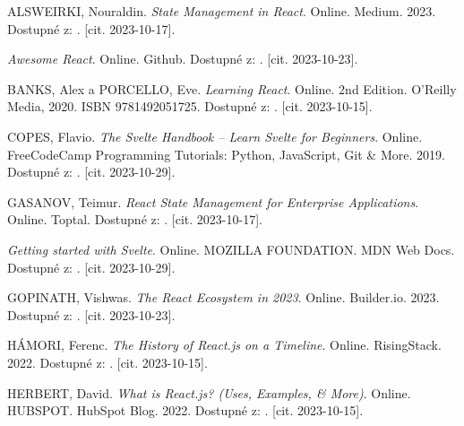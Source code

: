 

\begin{thebibliography}{99}\radkovani[1.2]\raggedright
\label{chap:literatura}

\textsc{ALSWEIRKI}, Nouraldin. \emph{State Management in React}. Online. Medium. 2023. Dostupné z: . [cit. 2023-10-17].

\emph{Awesome React}. Online. Github. Dostupné z: . [cit. 2023-10-23].

\textsc{BANKS}, Alex a \textsc{PORCELLO}, Eve. \emph{Learning React}. Online. 2nd Edition. O'Reilly Media, 2020. ISBN 9781492051725. Dostupné z: . [cit. 2023-10-15].

\textsc{COPES}, Flavio. \emph{The Svelte Handbook -- Learn Svelte for Beginners}. Online. FreeCodeCamp Programming Tutorials: Python, JavaScript, Git \& More. 2019. Dostupné z: . [cit. 2023-10-29].

\textsc{GASANOV}, Teimur. \emph{React State Management for Enterprise Applications}. Online. Toptal. Dostupné z: . [cit. 2023-10-17].

\emph{Getting started with Svelte}. Online. MOZILLA FOUNDATION. MDN Web Docs. Dostupné z: . [cit. 2023-10-29].

\textsc{GOPINATH}, Vishwas. \emph{The React Ecosystem in 2023}. Online. Builder.io. 2023. Dostupné z: . [cit. 2023-10-23].

\textsc{HÁMORI}, Ferenc. \emph{The History of React.js on a Timeline}. Online. RisingStack. 2022. Dostupné z: . [cit. 2023-10-15].

\textsc{HERBERT}, David. \emph{What is React.js? (Uses, Examples, \& More)}. Online. HUBSPOT. HubSpot Blog. 2022. Dostupné z: . [cit. 2023-10-15].


\end{thebibliography}
